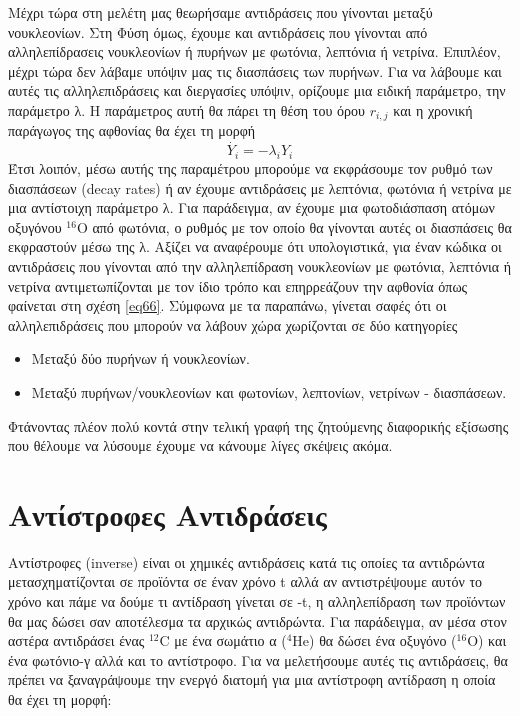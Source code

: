 Μέχρι τώρα στη μελέτη μας θεωρήσαμε αντιδράσεις που γίνονται μεταξύ νουκλεονίων. Στη Φύση όμως, έχουμε και αντιδράσεις που γίνονται από αλληλεπίδρασεις νουκλεονίων ή πυρήνων με φωτόνια, λεπτόνια ή νετρίνα. Επιπλέον, μέχρι τώρα δεν λάβαμε υπόψιν μας τις διασπάσεις των πυρήνων. Για να λάβουμε και αυτές τις αλληλεπιδράσεις και διεργασίες υπόψιν, ορίζουμε μια ειδική παράμετρο, την παράμετρο λ. Η παράμετρος αυτή θα πάρει τη θέση του όρου $r_{i,j}$ και η χρονική παράγωγος της αφθονίας θα έχει τη μορφή
\begin{equation}
\label{eq66}
\dot{Y_{i}}=-\lambda _{i} Y_{i}
\end{equation}
Έτσι λοιπόν, μέσω αυτής της παραμέτρου μπορούμε να εκφράσουμε τον ρυθμό των διασπάσεων (decay rates) ή αν έχουμε αντιδράσεις με λεπτόνια, φωτόνια ή νετρίνα με μια αντίστοιχη παράμετρο λ. Για παράδειγμα, αν έχουμε μια φωτοδιάσπαση ατόμων οξυγόνου $^{16}$O από φωτόνια, ο ρυθμός με τον οποίο θα γίνονται αυτές οι διασπάσεις θα εκφραστούν μέσω της λ. Αξίζει να αναφέρουμε ότι υπολογιστικά, για έναν κώδικα οι αντιδράσεις που γίνονται από την αλληλεπίδραση νουκλεονίων με φωτόνια, λεπτόνια ή νετρίνα αντιμετωπίζονται με τον ίδιο τρόπο και επηρρεάζουν την αφθονία όπως φαίνεται στη σχέση \eqref{eq66}. Σύμφωνα με τα παραπάνω, γίνεται σαφές ότι οι αλληλεπιδράσεις που μπορούν να λάβουν χώρα χωρίζονται σε  δύο κατηγορίες

\begin{itemize}
\item Mεταξύ δύο πυρήνων ή νουκλεονίων.
\item Μεταξύ πυρήνων/νουκλεονίων και φωτονίων, λεπτονίων, νετρίνων - διασπάσεων.
\end{itemize}

Φτάνοντας πλέον πολύ κοντά στην τελική γραφή της ζητούμενης διαφορικής εξίσωσης που θέλουμε να λύσουμε έχουμε να κάνουμε λίγες σκέψεις ακόμα.
\section{Αντίστροφες Αντιδράσεις}
Αντίστροφες (inverse) είναι οι χημικές αντιδράσεις κατά τις οποίες τα αντιδρώντα μετασχηματίζονται  σε προϊόντα σε έναν χρόνο t αλλά αν αντιστρέψουμε αυτόν το χρόνο και πάμε να δούμε τι αντίδραση γίνεται σε -t, η αλληλεπίδραση των προϊόντων θα μας δώσει σαν αποτέλεσμα τα αρχικώς αντιδρώντα. Για παράδειγμα, αν μέσα στον αστέρα αντιδράσει ένας  $^{12}$C με ένα σωμάτιο α ($^{4}$He) θα δώσει ένα οξυγόνο ($^{16}$O) και ένα φωτόνιο-γ αλλά και το αντίστροφο. Για να μελετήσουμε αυτές τις αντιδράσεις, θα πρέπει να ξαναγράψουμε την ενεργό διατομή για μια αντίστροφη αντίδραση η οποία θα έχει τη μορφή:

